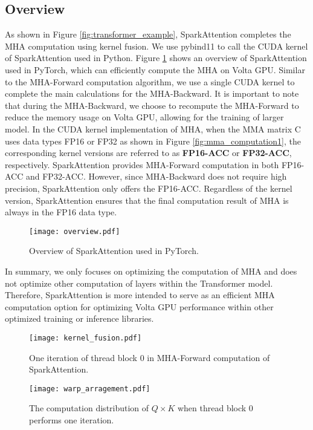 \documentclass[10pt,twocolumn]{article}
\begin{document}
\subsection{Overview}
As shown in Figure \ref{fig:transformer_example}, SparkAttention completes the MHA computation using kernel fusion.
We use pybind11\cite{pybind11} to call the CUDA kernel of SparkAttention used in Python.
Figure \ref{fig:overview} shows an overview of SparkAttention used in PyTorch, which can efficiently compute the MHA on Volta GPU.
Similar to the MHA-Forward computation algorithm, we use a single CUDA kernel to complete the main calculations for the MHA-Backward.
It is important to note that during the MHA-Backward, we choose to recompute the MHA-Forward to reduce the memory usage on Volta GPU, allowing for the training of larger model.
In the CUDA kernel implementation of MHA, when the MMA matrix C uses data types FP16 or FP32 as shown in Figure \ref{fig:mma_computation1}, the corresponding kernel versions are referred to as \textbf{FP16-ACC} or \textbf{FP32-ACC}, respectively.
SparkAttention provides MHA-Forward computation in both FP16-ACC and FP32-ACC. 
However, since MHA-Backward does not require high precision, SparkAttention only offers the FP16-ACC.
Regardless of the kernel version, SparkAttention ensures that the final computation result of MHA is always in the FP16 data type.

\begin{figure}[htbp] \small
  \centering
  \texttt{[image: overview.pdf]}
  \caption{Overview of SparkAttention used in PyTorch.}
  \label{fig:overview}%
\end{figure}
In summary, we only focuses on optimizing the computation of MHA and does not optimize other computation of layers within the Transformer model. 
Therefore, SparkAttention is more intended to serve as an efficient MHA computation option for optimizing Volta GPU performance within other optimized training or inference libraries.


\begin{figure*}[htbp] \small
  \centering
  \texttt{[image: kernel\_fusion.pdf]}
  \caption{One iteration of thread block 0 in MHA-Forward computation of SparkAttention.}
  \label{fig:kernel_fusion}%
\end{figure*}

\begin{figure}[htbp] \small
  \centering
  \texttt{[image: warp\_arragement.pdf]}
  \caption{The computation distribution of $Q\times K$ when thread block 0 performs one iteration.}
  \label{fig:warp_arragement}%
\end{figure}
\end{document}
